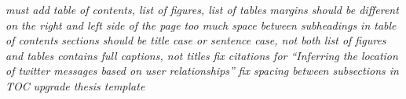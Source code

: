 \documentclass[colorlinks=false,12pt]{report}
\newcommand{\jam}[1]{\emph{#1}}
\begin{document}
\renewcommand\floatpagefraction{.9}
\renewcommand\textfraction{.1}

\renewcommand{\tamumanuscripttitle}{Location Prediction in Social Media Based
on Tie Strength}
\renewcommand{\tamupapertype}{Thesis}
\renewcommand{\tamufullname}{Jeffrey Allen McGee}
\renewcommand{\tamudegree}{Masters of Science}
\renewcommand{\tamuchairone}{James Caverlee}
\renewcommand{\tamumemberone}{Frank Shipman}
\newcommand{\tamumembertwo}{Daniel Sui}
\renewcommand{\tamudepthead}{Hank Walker}
\renewcommand{\tamugradmonth}{May}
\renewcommand{\tamugradyear}{2013}
\renewcommand{\tamudepartment}{Computer Science}

\newcommand*{\THESIS}{}%


%
%
%

\jam{must add table of contents, list of figures, list of tables}
\jam{margins should be different on the right and left side of the page}
\jam{too much space between subheadings in table of contents}
\jam{sections should be title case or sentence case, not both}
\jam{list of figures and tables contains full captions, not titles}
\jam{fix citations for  ``Inferring the location of twitter messages based on
    user relationships''}
\jam{fix spacing between subsections in TOC}
\jam{upgrade thesis template}









%
\end{document}
